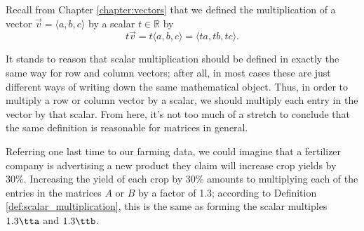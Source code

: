 Recall from Chapter \ref{chapter:vectors} that we defined the multiplication of a vector $\vec{v} = \langle a, b, c\rangle$ by a scalar $t\in\mathbb{R}$ by
\[
t\vec{v} = t\langle a, b, c\rangle = \langle ta, tb, tc\rangle.
\]


It stands to reason that scalar multiplication should be defined in exactly the same way for row and column vectors; after all, in most cases these are just different ways of writing down the same mathematical object. Thus, in order to multiply a row or column vector by a scalar, we should multiply each entry in the vector by that scalar. From here, it's not too much of a stretch to conclude that the same definition is reasonable for matrices in general.



\smallskip


Referring one last time to our farming data, we could imagine that a fertilizer company is advertising a new product they claim will increase crop yields by 30\%. Increasing the yield of each crop by 30\% amounts to multiplying each of the entries in the matrices $A$ or $B$ by a factor of 1.3; according to Definition \ref{def:scalar_multiplication}, this is the same as forming the scalar multiples $1.3\tta$ and $1.3\ttb$.

